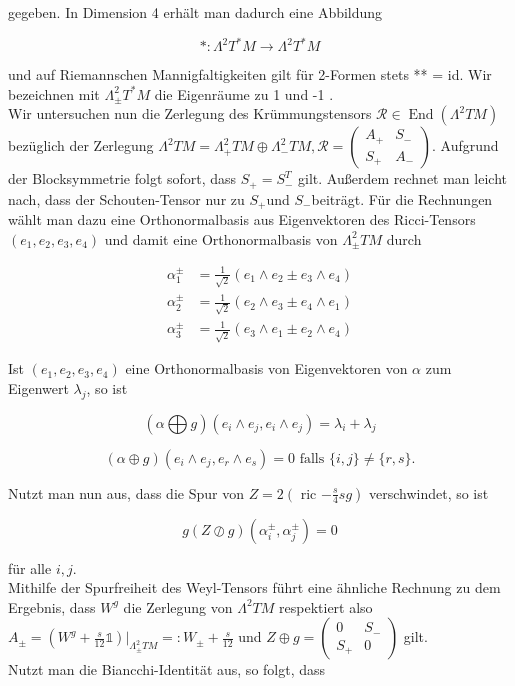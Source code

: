 \documentclass[10pt, letterpaper]{article}
\begin{document}
gegeben. In Dimension 4 erhält man dadurch eine Abbildung

$$
*: \Lambda^{2} T^{*} M \rightarrow \Lambda^{2} T^{*} M
$$

und auf Riemannschen Mannigfaltigkeiten gilt für 2-Formen stets ** = id. Wir bezeichnen mit $\Lambda_{ \pm}^{2} T^{*} M$ die Eigenräume zu 1 und -1 .\\
Wir untersuchen nun die Zerlegung des Krümmungstensors $\mathcal{R} \in \operatorname{End}\left(\Lambda^{2} T M\right)$ bezüglich der Zerlegung $\Lambda^{2} T M=\Lambda_{+}^{2} T M \oplus \Lambda_{-}^{2} T M, \mathcal{R}=\left(\begin{array}{cc}A_{+} & S_{-} \\ S_{+} & A_{-}\end{array}\right)$. Aufgrund der Blocksymmetrie folgt sofort, dass $S_{+}=S_{-}^{T}$ gilt. Außerdem rechnet man leicht nach, dass der Schouten-Tensor nur zu $S_{+}$und $S_{-}$beiträgt. Für die Rechnungen wählt man dazu eine Orthonormalbasis aus Eigenvektoren des Ricci-Tensors $\left(e_{1}, e_{2}, e_{3}, e_{4}\right)$ und damit eine Orthonormalbasis von $\Lambda_{ \pm}^{2} T M$ durch

$$
\begin{aligned}
\alpha_{1}^{ \pm} & =\frac{1}{\sqrt{2}}\left(e_{1} \wedge e_{2} \pm e_{3} \wedge e_{4}\right) \\
\alpha_{2}^{ \pm} & =\frac{1}{\sqrt{2}}\left(e_{2} \wedge e_{3} \pm e_{4} \wedge e_{1}\right) \\
\alpha_{3}^{ \pm} & =\frac{1}{\sqrt{2}}\left(e_{3} \wedge e_{1} \pm e_{2} \wedge e_{4}\right)
\end{aligned}
$$

Ist $\left(e_{1}, e_{2}, e_{3}, e_{4}\right)$ eine Orthonormalbasis von Eigenvektoren von $\alpha$ zum Eigenwert $\lambda_{j}$, so ist

$$
(\alpha \bigoplus g)\left(e_{i} \wedge e_{j}, e_{i} \wedge e_{j}\right)=\lambda_{i}+\lambda_{j}
$$

$$
(\alpha \oplus g)\left(e_{i} \wedge e_{j}, e_{r} \wedge e_{s}\right)=0 \text { falls }\{i, j\} \neq\{r, s\} .
$$

Nutzt man nun aus, dass die Spur von $Z=2\left(\right.$ ric $\left.-\frac{s}{4} s g\right)$ verschwindet, so ist

$$
g(Z \oslash g)\left(\alpha_{i}^{ \pm}, \alpha_{j}^{ \pm}\right)=0
$$

für alle $i, j$.\\
Mithilfe der Spurfreiheit des Weyl-Tensors führt eine ähnliche Rechnung zu dem Ergebnis, dass $W^{g}$ die Zerlegung von $\Lambda^{2} T M$ respektiert also $A_{ \pm}=\left(W^{g}+\right. \left.\frac{s}{12} \mathbb{1}\right)\left.\right|_{\Lambda_{ \pm}^{2} T M}=: W_{ \pm}+\frac{s}{12}$ und $Z \oplus g=\left(\begin{array}{cc}0 & S_{-} \\ S_{+} & 0\end{array}\right)$ gilt.\\
Nutzt man die Biancchi-Identität aus, so folgt, dass
\end{document}
